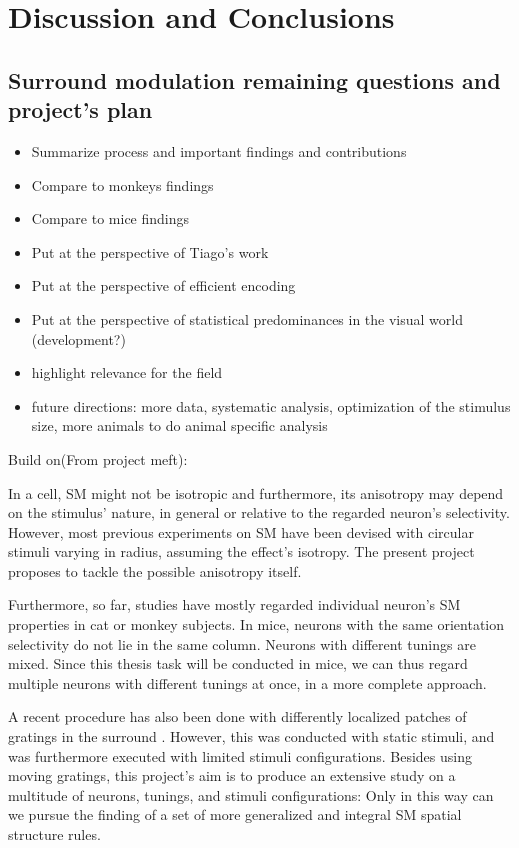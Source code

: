 \chapter{Discussion and Conclusions}
\label{cap:conclusions}


\section{Surround modulation remaining questions and project's plan} \label{Plan}

\begin{itemize}
\item Summarize process and important findings and contributions
\item Compare to monkeys findings
\item Compare to mice findings
\item Put at the perspective of Tiago's work
\item Put at the perspective of efficient encoding
\item Put at the perspective of statistical predominances in the visual world (development?)
\item highlight relevance for the field
\item future directions: more data, systematic analysis, optimization of the stimulus size, more animals to do animal specific analysis
\end{itemize}


Build on(From project meft):

In a cell, SM might not be isotropic and furthermore, its anisotropy may depend on the stimulus' nature, in general or relative to the regarded neuron's selectivity. However, most previous experiments on SM have been devised with circular stimuli varying in radius, assuming the effect's isotropy. The present project proposes to tackle the possible anisotropy itself.

Furthermore, so far, studies have mostly regarded individual neuron's SM properties in cat or monkey subjects. In mice, neurons with the same orientation selectivity do not lie in the same column. Neurons with different tunings are mixed. Since this thesis task will be conducted in mice, we can thus regard multiple neurons with different tunings at once, in a more complete approach.

A recent procedure has also been done with differently localized patches of gratings in the surround \cite{SManisotropy}. However, this was conducted with static stimuli, and was furthermore executed with limited stimuli configurations. Besides using moving gratings, this project's aim is to produce an extensive study on a multitude of neurons, tunings, and stimuli configurations: Only in this way can we pursue the finding of a set of more generalized and integral SM spatial structure rules.

